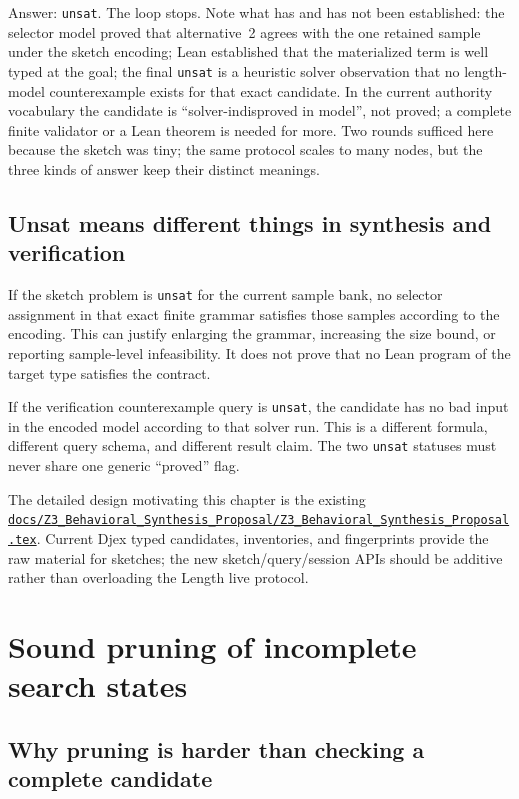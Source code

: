 \documentclass[10pt,letterpaper,oneside]{report}
\newcommand{\unsat}{\texttt{unsat}}
\def\LeantCommit{494259dbd85ae2e6749246b08377f44b2f9936ac}
\def\LeantBase{https://github.com/VladimirReshetnikov/Leant/blob/\LeantCommit/}
\newcommand{\lpath}[1]{\href{\LeantBase#1}{\nolinkurl{#1}}}
\begin{document}
Answer: \unsat{}. The loop stops. Note what has and has not been established: the selector model proved that alternative~2 agrees with the one retained sample under the sketch encoding; Lean established that the materialized term is well typed at the goal; the final \unsat{} is a heuristic solver observation that no length-model counterexample exists for that exact candidate. In the current authority vocabulary the candidate is ``solver-indisproved in model'', not proved; a complete finite validator or a Lean theorem is needed for more. Two rounds sufficed here because the sketch was tiny; the same protocol scales to many nodes, but the three kinds of answer keep their distinct meanings.


\section{Unsat means different things in synthesis and verification}

If the sketch problem is \unsat{} for the current sample bank, no selector assignment in that exact finite grammar satisfies those samples according to the encoding. This can justify enlarging the grammar, increasing the size bound, or reporting sample-level infeasibility. It does not prove that no Lean program of the target type satisfies the contract.

If the verification counterexample query is \unsat{}, the candidate has no bad input in the encoded model according to that solver run. This is a different formula, different query schema, and different result claim. The two \unsat{} statuses must never share one generic ``proved'' flag.

\begin{sourcebox}
The detailed design motivating this chapter is the existing \lpath{docs/Z3_Behavioral_Synthesis_Proposal/Z3_Behavioral_Synthesis_Proposal.tex}. Current Djex typed candidates, inventories, and fingerprints provide the raw material for sketches; the new sketch/query/session APIs should be additive rather than overloading the Length live protocol.
\end{sourcebox}

\chapter{Sound pruning of incomplete search states}
\label{chap:prefix-pruning}

\section{Why pruning is harder than checking a complete candidate}
\end{document}

